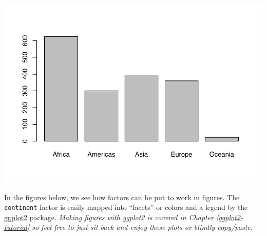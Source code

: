 \documentclass[
]{book}
\newenvironment{Shaded}{\begin{snugshade}}{\end{snugshade}}
\newcommand{\CommentTok}[1]{\textcolor[rgb]{0.56,0.35,0.01}{\textit{#1}}}
\newcommand{\KeywordTok}[1]{\textcolor[rgb]{0.13,0.29,0.53}{\textbf{#1}}}
\newcommand{\NormalTok}[1]{#1}
\newcommand{\OperatorTok}[1]{\textcolor[rgb]{0.81,0.36,0.00}{\textbf{#1}}}
\begin{document}
\begin{Shaded}
\end{Shaded}

\includegraphics{05_data-care-feeding_files/figure-latex/tabulate-continent-1.pdf}

In the figures below, we see how factors can be put to work in figures. The \texttt{continent} factor is easily mapped into ``facets'' or colors and a legend by the \href{https://ggplot2.tidyverse.org}{ggplot2} package. \emph{Making figures with ggplot2 is covered in Chapter \ref{ggplot2-tutorial} so feel free to just sit back and enjoy these plots or blindly copy/paste.}
\end{document}
